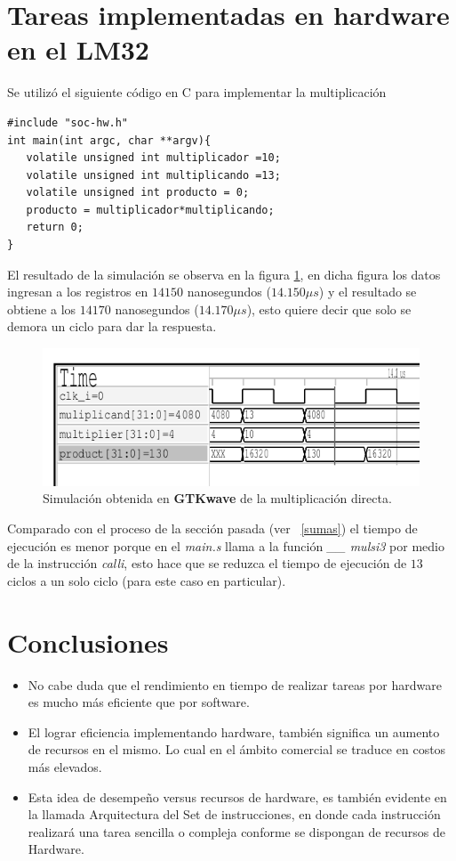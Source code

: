 \documentclass[twocolumn]{IEEEtran}
\begin{document}
\section{Tareas implementadas en hardware en el LM32}
\noindent
Se utilizó el siguiente código en C para implementar la multiplicación 
\lstset{numbers=left, numberstyle=\tiny, stepnumber=1, numbersep=1pt}
\begin{lstlisting}[firstnumber=7, caption=Codigo inicial, label=code1]
#include "soc-hw.h"
int main(int argc, char **argv){
   volatile unsigned int multiplicador =10;
   volatile unsigned int multiplicando =13;
   volatile unsigned int producto = 0;
   producto = multiplicador*multiplicando;
   return 0;
}
\end{lstlisting}
\noindent
El resultado de la simulación se observa en la figura \ref{fig2}, en dicha figura los datos ingresan a los registros en $14150$ nanosegundos ($14.150 \mu s$) y el resultado se obtiene a los $14170$ nanosegundos ($14.170 \mu s$), esto quiere decir que solo se demora un ciclo para dar la respuesta.
\begin{figure}[H]
	\centering
		\includegraphics[scale=0.45]	{simulation_multiplication.png}
	\caption{Simulación obtenida en \textbf{GTKwave} de la multiplicación directa.}
	\label{fig2}
\end{figure}
\noindent
Comparado con el proceso de la sección pasada (ver ~\ref{sumas}) el tiempo de ejecución es menor porque en el \textit{main.s} llama a la función \textit{\_\_ mulsi3} por medio de la instrucción \textit{calli}, esto hace que se reduzca el tiempo de ejecución de $13$ ciclos a un solo ciclo (para este caso en particular).

\section{Conclusiones}
\begin{itemize}
\item No cabe duda que el rendimiento en tiempo de realizar tareas por hardware es mucho más eficiente que por software.
\item El lograr eficiencia implementando hardware, también significa un aumento de recursos en el mismo. Lo cual en el ámbito comercial se traduce en costos más elevados.
\item Esta idea de desempeño versus recursos de hardware, es también evidente en la llamada Arquitectura del Set de instrucciones, en donde cada instrucción realizará una tarea sencilla o compleja conforme se dispongan de recursos de Hardware.
\end{itemize}
\end{document}
